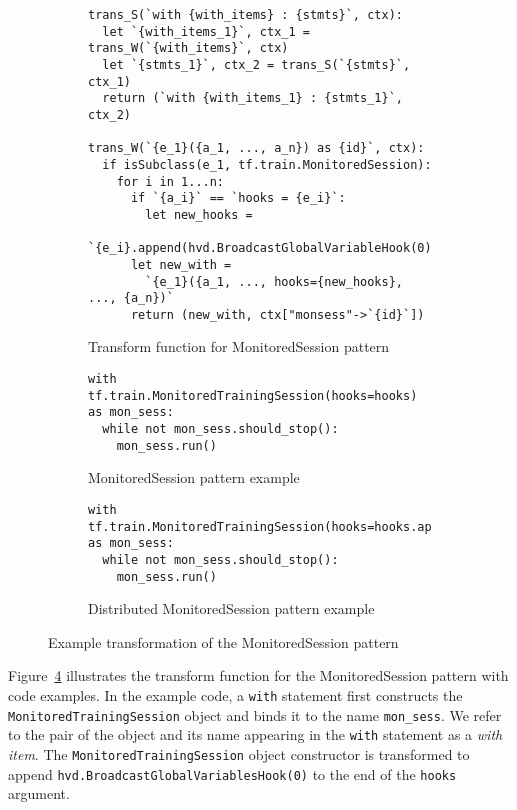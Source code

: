 \begin{figure}[ht!]
  \centering
  \begin{subfigure}{1\textwidth}
  \begin{lstlisting}[style=mpython]
trans_S(`with {with_items} : {stmts}`, ctx):
  let `{with_items_1}`, ctx_1 = trans_W(`{with_items}`, ctx)
  let `{stmts_1}`, ctx_2 = trans_S(`{stmts}`, ctx_1)
  return (`with {with_items_1} : {stmts_1}`, ctx_2) 

trans_W(`{e_1}({a_1, ..., a_n}) as {id}`, ctx):
  if isSubclass(e_1, tf.train.MonitoredSession):
    for i in 1...n:
	  if `{a_i}` == `hooks = {e_i}`:
	    let new_hooks = 
        `{e_i}.append(hvd.BroadcastGlobalVariableHook(0))`
      let new_with = 
        `{e_1}({a_1, ..., hooks={new_hooks}, ..., {a_n})` 
      return (new_with, ctx["monsess"->`{id}`])\end{lstlisting}
  \caption{Transform function for MonitoredSession pattern}
  \label{fig:trans:monsesstrans:fn}
  \end{subfigure}

  \begin{subfigure}[t]{1\textwidth}
    \begin{lstlisting}[style=mpython]
with tf.train.MonitoredTrainingSession(hooks=hooks) as mon_sess:
  while not mon_sess.should_stop():
    mon_sess.run()\end{lstlisting}
    \caption{MonitoredSession pattern example}
    \label{fig:trans:monsesstrans:a}
  \end{subfigure}
  \hspace{5mm}
  \begin{subfigure}[t]{1\textwidth}
    \begin{lstlisting}[style=mpython]
with tf.train.MonitoredTrainingSession(hooks=hooks.append(hvd.BroadcastGlobalVariablesHook(0)) as mon_sess:
  while not mon_sess.should_stop():
    mon_sess.run()\end{lstlisting}
    \caption{Distributed MonitoredSession pattern example}
    \label{fig:trans:monsesstrans:b}
  \end{subfigure}
  \caption{Example transformation of the MonitoredSession pattern}
  \label{fig:trans:monsesstrans}
\end{figure}


Figure~\ref{fig:trans:monsesstrans} illustrates the transform function for the
MonitoredSession pattern with code examples.
In the example code, a {\tt with} statement first constructs the {\tt
MonitoredTrainingSession} object and binds it to the name {\tt mon\_sess}.
We refer to the pair of the object and its name appearing in the {\tt with} statement
as a {\it with item}.
The {\tt MonitoredTrainingSession} object constructor is transformed to append
{\tt hvd.BroadcastGlobalVariablesHook(0)} to the end of the {\tt hooks}
argument.

